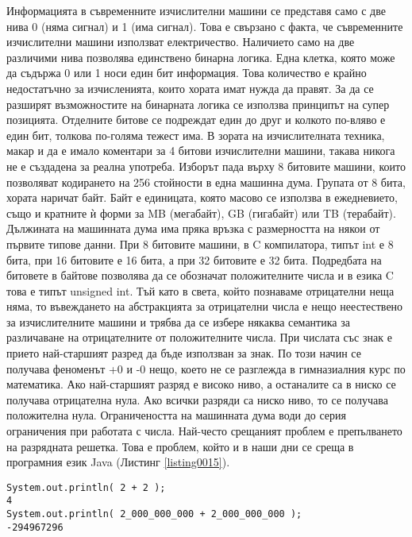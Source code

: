 Информацията в съвременните изчислителни машини се представя само с две нива 0 (няма сигнал) и 1 (има сигнал). Това е свързано с факта, че съвременните изчислителни машини използват електричество. Наличието само на две различими нива позволява единствено бинарна логика. Една клетка, която може да съдържа 0 или 1 носи един бит информация. Това количество е крайно недостатъчно за изчисленията, които хората имат нужда да правят. За да се разширят възможностите на бинарната логика се използва принципът на супер позицията. Отделните битове се подреждат един до друг и колкото по-вляво е един бит, толкова по-голяма тежест има. В зората на изчислителната техника, макар и да е имало коментари за 4 битови изчислителни машини, такава никога не е създадена за реална употреба. Изборът пада върху 8 битовите машини, които позволяват кодирането на 256 стойности в една машинна дума. Групата от 8 бита, хората наричат байт. Байт е единицата, която масово се използва в ежедневието, също и кратните ѝ форми за MB (мегабайт), GB (гигабайт) или TB (терабайт). Дължината на машинната дума има пряка връзка с размерността на някои от първите типове данни. При 8 битовите машини, в C компилатора, типът int е 8 бита, при 16 битовите е 16 бита, а при 32 битовите е 32 бита. Подредбата на битовете в байтове позволява да се обозначат положителните числа и в езика C това е типът unsigned int. Тъй като в света, който познаваме отрицателни неща няма, то въвеждането на абстракцията за отрицателни числа е нещо неестествено за изчислителните машини и трябва да се избере някаква семантика за различаване на отрицателните от положителните числа. При числата със знак е прието най-старшият разред да бъде използван за знак. По този начин се получава феноменът +0 и -0 нещо, което не се разглежда в гимназиалния курс по математика. Ако най-старшият разряд е високо ниво, а останалите са в ниско се получава отрицателна нула. Ако всички разряди са ниско ниво, то се получава положителна нула. Ограничеността на машинната дума води до серия ограничения при работата с числа. Най-често срещаният проблем е препълването на разрядната решетка. Това е проблем, който и в наши дни се среща в програмния език Java (Листинг \ref{listing0015}).

\begin{lstlisting}[caption=Грешка от препълване при събиране, label=listing0015]
System.out.println( 2 + 2 );
4
System.out.println( 2_000_000_000 + 2_000_000_000 );
-294967296
\end{lstlisting}

